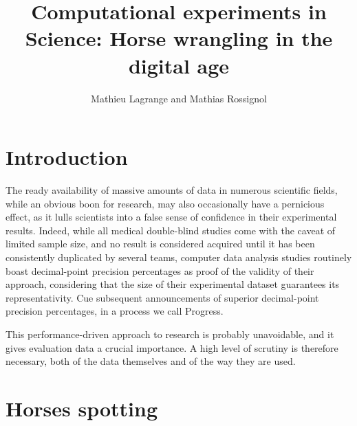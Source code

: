 \documentclass[a4paper,fleqn]{tufte-handout}
\title{Computational experiments in Science: Horse wrangling in the digital age}
\author{Mathieu Lagrange and Mathias Rossignol}
\begin{document}
\maketitle

\section{Introduction}

The ready availability of massive amounts of data in numerous scientific fields, while an obvious boon for research, may also occasionally have a pernicious effect, as it lulls scientists into a false sense of confidence in their experimental results. Indeed, while all medical double-blind studies come with the caveat of limited sample size, and no result is considered acquired until it has been consistently duplicated by several teams, computer data analysis studies routinely boast decimal-point precision percentages as proof of the validity of their approach, considering that the size of their experimental dataset guarantees its representativity. Cue subsequent announcements of superior decimal-point precision percentages, in a process we call Progress.

This performance-driven approach to research is probably unavoidable, and it gives evaluation data a crucial importance. A high level of scrutiny is therefore necessary, both of the data themselves and of the way they are used.


\section{Horses spotting}
\end{document}
